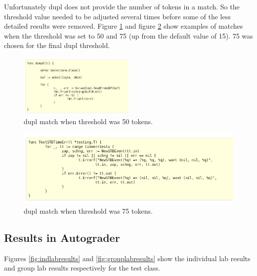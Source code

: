\documentclass[10pt,journal,compsoc]{IEEEtran}
\begin{document}
		Unfortunately dupl does not provide the number of tokens in a match. So the threshold value needed to be adjusted several times before some of the less detailed results were removed. Figure \ref{fig:dupl50} and figure \ref{fig:dupl75} show examples of matches when the threshold was set to 50 and 75 (up from the default value of 15). 75 was chosen for the final dupl threshold.
		
		\begin{figure}[h!]
			\includegraphics[width=0.5\textwidth]{dupl50.png}
			\caption{dupl match when threshold was 50 tokens.}
			\label{fig:dupl50}
		\end{figure}
		
		\begin{figure}[h!]
			\includegraphics[width=1.0\textwidth]{dupl75.png}
			\caption{dupl match when threshold was 75 tokens.}
			\label{fig:dupl75}
		\end{figure}
		
		\subsection{Results in Autograder}
		
		Figures \ref{fig:indlabresults} and \ref{fig:grouplabresults} show the individual lab results and group lab results respectively for the test class.
		
\end{document}
